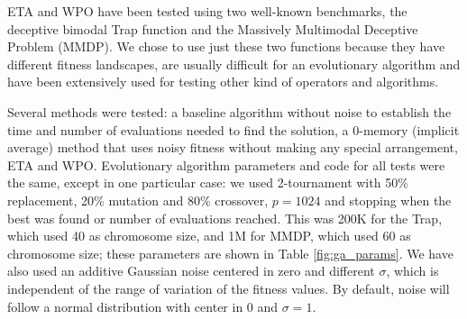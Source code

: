 \documentclass{llncs}
\begin{document}
ETA and WPO have been tested using two well-known benchmarks, the deceptive bimodal Trap \cite{deb1992analyzing}
function and the Massively Multimodal Deceptive Problem \cite{goldberg92massive} (MMDP). 
We chose to use just these two functions 
because they have different fitness landscapes, are usually difficult
for an evolutionary algorithm and have been extensively used for
testing other kind of operators and algorithms.

Several methods were tested: a baseline algorithm without
noise to establish the time and number of evaluations
needed to find the solution, a 0-memory (implicit average) method that
uses noisy fitness without making any special arrangement, ETA and
WPO. Evolutionary algorithm parameters and code for all tests were the
same, except in one
particular case: we used 2-tournament with 50\% replacement, 20\%
mutation and 80\% crossover, $p=1024$ and stopping when the best was
found or number of evaluations reached. This was 200K for the Trap,
which used 40 as chromosome size, and 1M for MMDP, which used 60 as
chromosome size; these parameters are shown in Table \ref{fig:ga_params}. We have also used an additive Gaussian noise centered in zero
and different $\sigma$, which is independent of the range of variation of the fitness values. By default, noise will follow a normal distribution with center in 0 and $\sigma=1$.
\end{document}

